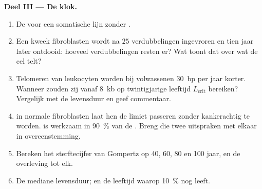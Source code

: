 \begin{problem}
\medskip
\noindent\textbf{Deel III --- De klok.}
\begin{enumerate}[resume]
  \item De  voor een somatische lijn zonder .
  \item Een kweek fibroblasten wordt na $25$ verdubbelingen ingevroren
        en tien jaar later ontdooid: hoeveel verdubbelingen resten er?
        Wat toont dat over wat de cel telt?
  \item Telomeren van leukocyten worden bij volwassenen \qty{30}{bp}
        per jaar korter. Wanneer zouden zij vanaf \qty{8}{kb} op
        twintigjarige leeftijd $L_{\text{crit}}$ bereiken? Vergelijk
        met de levensduur en geef commentaar.
  \item {} in normale fibroblasten laat hen de limiet passeren
        zonder kankerachtig te worden.  is werkzaam in
        \qty{90}{\%} van de . Breng die twee uitspraken met
        elkaar in overeenstemming.
  \item Bereken het sterftecijfer van Gompertz op 40, 60, 80 en 100
        jaar, en de overleving tot elk.
  \item De mediane levensduur; en de leeftijd waarop \qty{10}{\%} nog leeft.
\end{enumerate}


\end{problem}
